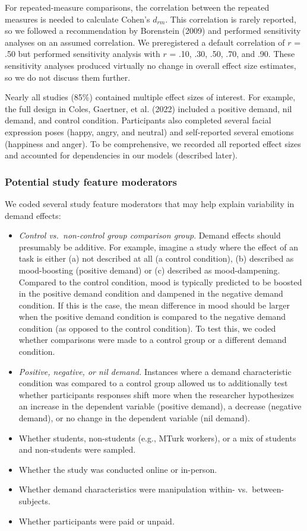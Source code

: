 \documentclass[
  man,floatsintext]{apa6}
\begin{document}
For repeated-measure comparisons, the correlation between the repeated measures is needed to calculate Cohen's \(d_{rm}\). This correlation is rarely reported, so we followed a recommendation by Borenstein (2009) and performed sensitivity analyses on an assumed correlation. We preregistered a default correlation of \(r\) = .50 but performed sensitivity analysis with \(r\) = .10, .30, .50, .70, and .90. These sensitivity analyses produced virtually no change in overall effect size estimates, so we do not discuss them further.

Nearly all studies (85\%) contained multiple effect sizes of interest. For example, the full design in Coles, Gaertner, et al. (2022) included a positive demand, nil demand, and control condition. Participants also completed several facial expression poses (happy, angry, and neutral) and self-reported several emotions (happiness and anger). To be comprehensive, we recorded all reported effect sizes and accounted for dependencies in our models (described later).

\hypertarget{potential-study-feature-moderators}{%
\subsubsection{Potential study feature moderators}\label{potential-study-feature-moderators}}

We coded several study feature moderators that may help explain variability in demand effects:

\begin{itemize}
\item
  \emph{Control vs.~non-control group comparison group}. Demand effects should presumably be additive. For example, imagine a study where the effect of an task is either (a) not described at all (a control condition), (b) described as mood-boosting (positive demand) or (c) described as mood-dampening. Compared to the control condition, mood is typically predicted to be boosted in the positive demand condition and dampened in the negative demand condition. If this is the case, the mean difference in mood should be larger when the positive demand condition is compared to the negative demand condition (as opposed to the control condition). To test this, we coded whether comparisons were made to a control group or a different demand condition.
\item
  \emph{Positive, negative, or nil demand.} Instances where a demand characteristic condition was compared to a control group allowed us to additionally test whether participants responses shift more when the researcher hypothesizes an increase in the dependent variable (positive demand), a decrease (negative demand), or no change in the dependent variable (nil demand).
\item
  Whether students, non-students (e.g., MTurk workers), or a mix of students and non-students were sampled.
\item
  Whether the study was conducted online or in-person.
\item
  Whether demand characteristics were manipulation within- vs.~between-subjects.
\item
  Whether participants were paid or unpaid.
\end{itemize}
\end{document}
